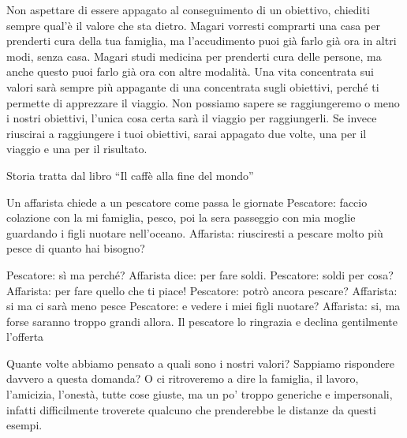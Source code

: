 \documentclass[12pt]{book} %
\begin{document}
Non aspettare di essere appagato al conseguimento di un obiettivo, chiediti sempre qual'è il valore
che sta dietro. Magari vorresti comprarti una casa per prenderti cura della tua famiglia, ma l'accudimento puoi già farlo già ora in altri modi, senza casa.
Magari studi medicina per prenderti cura delle persone, ma anche questo puoi farlo già ora con altre modalità. Una vita
concentrata sui valori sarà sempre più appagante di una concentrata sugli obiettivi, perché ti permette di apprezzare
il viaggio. Non possiamo sapere se raggiungeremo o meno i nostri obiettivi, l'unica cosa certa
sarà il viaggio per raggiungerli. Se invece riuscirai a raggiungere i tuoi obiettivi, sarai appagato due volte, una per
il viaggio e una per il risultato.

\begin{mdframed}[linewidth=1pt]
Storia tratta dal libro “Il caffè alla fine del
mondo”

Un affarista chiede a un pescatore come passa le giornate\newline
Pescatore: faccio colazione con la mi famiglia, pesco, poi la sera passeggio con mia moglie guardando i figli nuotare
nell'oceano.\newline
Affarista: riusciresti a pescare molto più pesce di quanto hai bisogno?

Pescatore: sì ma perché? \newline
Affarista dice: per fare soldi. \newline
Pescatore: soldi per cosa? \newline
Affarista: per fare quello che ti piace! \newline
Pescatore: potrò ancora pescare?\newline
Affarista: si ma ci sarà meno pesce\newline
Pescatore: e vedere i miei figli nuotare?\newline
Affarista: si, ma forse saranno troppo grandi allora.\newline
Il pescatore lo ringrazia e declina gentilmente l'offerta 
\end{mdframed}

\bigskip

Quante volte abbiamo pensato a quali sono i nostri valori?
Sappiamo rispondere davvero a questa domanda? O ci ritroveremo a dire la famiglia, il lavoro,
l'amicizia, l'onestà, tutte cose giuste, ma un po' troppo generiche e impersonali, infatti difficilmente troverete qualcuno che prenderebbe le distanze da questi esempi.
\end{document}
